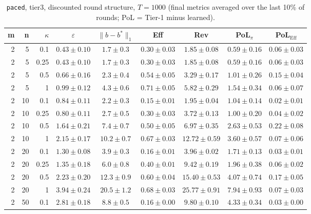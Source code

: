 \begin{table}[htbp]
\centering
\scriptsize
\caption{\texttt{paced}, tier3, discounted round structure, $T=1000$ (final metrics averaged over the last 10\% of rounds; PoL = Tier-1 minus learned).}
\label{tab:tier3_paced_discounted}
\begin{tabular}{@{}rrrcccccc@{}}
\toprule
m & n & $\kappa$ & $\varepsilon$ & $\|b-b^*\|_1$ & Eff & Rev & PoL$_\pi$ & PoL$_\mathrm{Eff}$ \\
\midrule
2 & 5 & 0.1 & $0.43 \pm 0.10$ & $1.7 \pm 0.3$ & $0.30 \pm 0.03$ & $1.85 \pm 0.08$ & $0.59 \pm 0.16$ & $0.06 \pm 0.03$ \\
2 & 5 & 0.25 & $0.43 \pm 0.10$ & $1.7 \pm 0.3$ & $0.30 \pm 0.03$ & $1.85 \pm 0.08$ & $0.59 \pm 0.16$ & $0.06 \pm 0.03$ \\
2 & 5 & 0.5 & $0.66 \pm 0.16$ & $2.3 \pm 0.4$ & $0.54 \pm 0.05$ & $3.29 \pm 0.17$ & $1.01 \pm 0.26$ & $0.15 \pm 0.04$ \\
2 & 5 & 1 & $0.99 \pm 0.12$ & $4.3 \pm 0.6$ & $0.71 \pm 0.05$ & $5.82 \pm 0.29$ & $1.54 \pm 0.34$ & $0.06 \pm 0.07$ \\
2 & 10 & 0.1 & $0.84 \pm 0.11$ & $2.2 \pm 0.3$ & $0.15 \pm 0.01$ & $1.95 \pm 0.04$ & $1.04 \pm 0.14$ & $0.02 \pm 0.01$ \\
2 & 10 & 0.25 & $0.80 \pm 0.11$ & $2.7 \pm 0.5$ & $0.30 \pm 0.03$ & $3.72 \pm 0.13$ & $1.00 \pm 0.20$ & $0.04 \pm 0.02$ \\
2 & 10 & 0.5 & $1.64 \pm 0.21$ & $7.4 \pm 0.7$ & $0.50 \pm 0.05$ & $6.97 \pm 0.35$ & $2.63 \pm 0.53$ & $0.22 \pm 0.08$ \\
2 & 10 & 1 & $2.15 \pm 0.17$ & $10.2 \pm 0.7$ & $0.67 \pm 0.03$ & $12.72 \pm 0.59$ & $3.60 \pm 0.57$ & $0.07 \pm 0.06$ \\
2 & 20 & 0.1 & $1.30 \pm 0.08$ & $3.9 \pm 0.3$ & $0.16 \pm 0.01$ & $3.96 \pm 0.02$ & $1.71 \pm 0.13$ & $0.03 \pm 0.01$ \\
2 & 20 & 0.25 & $1.35 \pm 0.18$ & $6.0 \pm 0.8$ & $0.40 \pm 0.01$ & $9.42 \pm 0.19$ & $1.96 \pm 0.38$ & $0.06 \pm 0.02$ \\
2 & 20 & 0.5 & $2.23 \pm 0.20$ & $12.3 \pm 0.9$ & $0.60 \pm 0.04$ & $15.40 \pm 0.53$ & $4.07 \pm 0.74$ & $0.17 \pm 0.05$ \\
2 & 20 & 1 & $3.94 \pm 0.24$ & $20.5 \pm 1.2$ & $0.68 \pm 0.03$ & $25.77 \pm 0.91$ & $7.94 \pm 0.93$ & $0.07 \pm 0.03$ \\
2 & 50 & 0.1 & $2.81 \pm 0.18$ & $8.8 \pm 0.5$ & $0.16 \pm 0.00$ & $9.80 \pm 0.10$ & $4.33 \pm 0.34$ & $0.03 \pm 0.00$ \\

\end{tabular}
\end{table}
